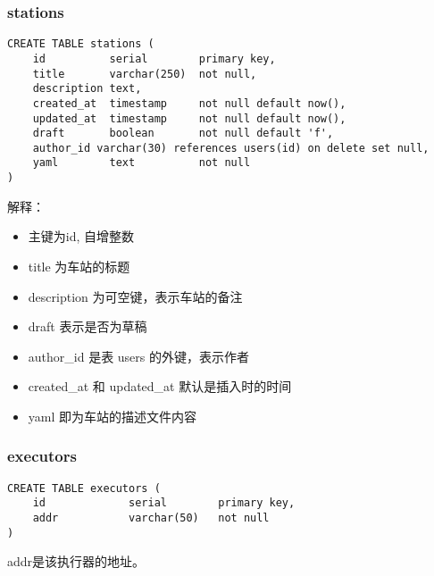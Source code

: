 \subsubsection{stations}
\begin{lstlisting}
CREATE TABLE stations (
    id          serial        primary key,
    title       varchar(250)  not null,
    description text,
    created_at  timestamp     not null default now(),
    updated_at  timestamp     not null default now(),
    draft       boolean       not null default 'f',
    author_id varchar(30) references users(id) on delete set null,
    yaml        text          not null
)
\end{lstlisting}
解释：
\begin{itemize}
    \item 主键为id, 自增整数
    \item title 为车站的标题
    \item description 为可空键，表示车站的备注
    \item draft 表示是否为草稿
    \item author\_id 是表 users 的外键，表示作者
    \item created\_at 和 updated\_at 默认是插入时的时间
    \item yaml 即为车站的描述文件内容
\end{itemize}

\subsubsection{executors}
\begin{lstlisting}
CREATE TABLE executors (
    id             serial        primary key,
    addr           varchar(50)   not null
)
\end{lstlisting}
addr是该执行器的地址。

